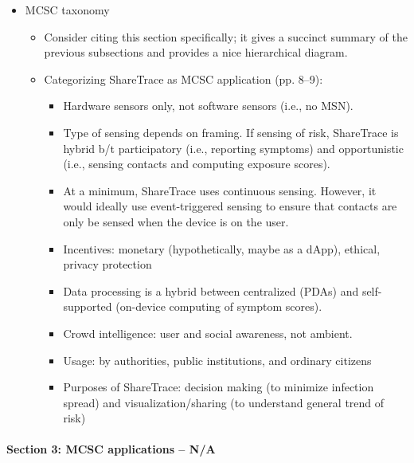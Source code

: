 \begin{itemize}
\begin{itemize}
		\item MCSC taxonomy
			\begin{itemize}
			\item Consider citing this section specifically; it gives a succinct summary of the previous subsections and provides a nice hierarchical diagram.
			\item Categorizing ShareTrace as MCSC application (pp. 8--9):
				\begin{itemize}
				\item Hardware sensors only, not software sensors (i.e., no MSN).
				\item Type of sensing depends on framing. If sensing of risk, ShareTrace is hybrid b/t participatory (i.e., reporting symptoms) and opportunistic (i.e., sensing contacts and computing exposure scores).
				\item At a minimum, ShareTrace uses continuous sensing. However, it would ideally use event-triggered sensing to ensure that contacts are only be sensed when the device is on the user.
				\item Incentives: monetary (hypothetically, maybe as a dApp), ethical, privacy protection
				\item Data processing is a hybrid between centralized (PDAs) and self-supported (on-device computing of symptom scores).
				\item Crowd intelligence: user and social awareness, not ambient.
				\item Usage: by authorities, public institutions, and ordinary citizens
				\item Purposes of ShareTrace: decision making (to minimize infection spread) and visualization/sharing (to understand general trend of risk)
				\end{itemize}
			\end{itemize}
		\end{itemize}
	\end{itemize}
\paragraph{Section 3: MCSC applications -- N/A}
